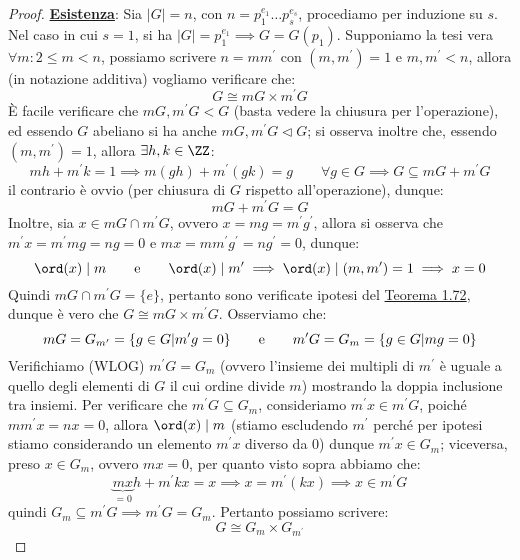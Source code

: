 \documentclass[11pt]{scrartcl}
\begin{document}
\begin{proof}
    \underline{\textbf{Esistenza}}: Sia $|G| = n$, con $n = p_1^{e_1} \ldots p_s^{e_s}$, procediamo per induzione su $s$. Nel caso in cui $s = 1$, si ha $|G| = p_1^{e_1} \implies G = G(p_1)$. Supponiamo 
    la tesi vera $\forall m : 2 \leq m < n$, possiamo scrivere $n = m m^{\prime}$ con $(m,m^{\prime}) = 1$ e $m,m^{\prime} < n$, allora (in notazione additiva) vogliamo verificare che:
        \[ G \cong mG \times m^{\prime}G
            \]
        È facile verificare che $mG,m^{\prime}G < G$ (basta vedere la chiusura per l'operazione), ed essendo $G$ abeliano si ha anche $mG,m^{\prime}G \triangleleft G$; si osserva inoltre che, essendo $(m,m^{\prime}) = 1$, allora $\exists h,k \in \ZZ$:
            \[ mh + m^{\prime}k = 1 \implies m(gh) + m^{\prime}(gk) = g \qquad \forall g \in G \implies G \subseteq mG + m^{\prime}G
                \]
        il contrario è ovvio (per chiusura di $G$ rispetto all'operazione), dunque:
            \[ mG + m^{\prime}G = G
                \]
        Inoltre, sia $x \in mG \cap m^{\prime}G$, ovvero $x = mg = m^{\prime}g^{\prime}$, allora si osserva che $m^{\prime}x = m^{\prime}mg = ng = 0$ e $mx = mm^{\prime}g^{\prime} = ng^{\prime} = 0$, dunque:
            \[ \ord(x) \mid m \qquad \text e \qquad \ord(x) \mid m^{\prime} \implies \ord(x) \mid (m,m^{\prime}) = 1 \implies x = 0
                \]
        Quindi $mG \cap m^{\prime}G = \{e\}$, pertanto sono verificate ipotesi del \hyperref[t:1.72]{Teorema 1.72}, dunque è vero che $G \cong mG \times m^{\prime}G$. Osserviamo che:
            \[ mG = G_{m^{\prime}} = \{g \in G | m^{\prime}g = 0\} \qquad \text e \qquad m^{\prime}G = G_m = \{g \in G | mg = 0\}
                \]
        Verifichiamo (WLOG) $m^{\prime}G = G_m$ (ovvero l'insieme dei multipli di $m^{\prime}$ è uguale a quello degli elementi di $G$ il cui ordine divide $m$) mostrando la doppia inclusione tra insiemi.
        Per verificare che $m^{\prime}G \subseteq G_m$, consideriamo $m^{\prime}x \in m^{\prime}G$, poiché $mm^{\prime}x = nx = 0$, allora $\ord(x) \mid m$ (stiamo escludendo $m^{\prime}$ perché per ipotesi
        stiamo considerando un elemento $m^{\prime}x$ diverso da 0) dunque $m^{\prime}x \in G_m$; viceversa, preso $x \in G_m$, ovvero $mx = 0$, per quanto visto sopra abbiamo che:
            \[ \underbrace{mx}_{= 0}h + m^{\prime}kx = x \implies x = m^{\prime}(kx) \implies x \in m^{\prime}G
                \]
        quindi $G_m \subseteq m^{\prime}G \implies m^{\prime}G = G_m$. Pertanto possiamo scrivere:
            \[ G \cong G_m \times G_{m^\prime}
\]
\end{proof}
\end{document}
